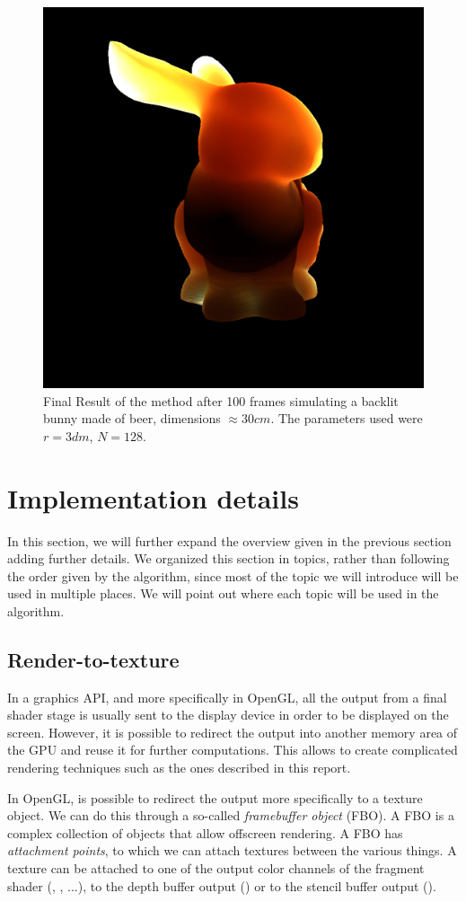 \begin{figure}[!ht]
\centering
\includegraphics[width=0.6 \linewidth]{images/results/beer_backlit_100_convergence.png}
\caption{Final Result of the method after 100 frames simulating a backlit bunny made of beer, dimensions $\approx 30 cm$. The parameters used were $r = 3 dm$, $N = 128$.}
\label{fig:beer_result}
\end{figure} 
 
\FloatBarrier

\section{Implementation details}
In this section, we will further expand the overview  given in the previous section adding further details. We organized this section in topics, rather than following the order given by the algorithm, since most of the topic we will introduce will be used in multiple places. We will point out where each topic will be used in the algorithm.

\subsection{Render-to-texture}
In a graphics API, and more specifically in OpenGL, all the output from a final shader stage is usually sent to the display device in order to be displayed on the screen. However, it is possible to redirect the output into another memory area of the GPU and reuse it for further computations. This allows to create complicated rendering techniques such as the ones described in this report. 

In OpenGL, is possible to redirect the output more specifically to a texture object. We can do this through a so-called \emph{framebuffer object} (FBO). A FBO is a complex collection of objects that allow offscreen rendering. A FBO has \emph{attachment points}, to which we can attach textures between the various things. A texture can be attached to one of the output color channels of the fragment shader (, , ...), to the depth buffer output () or to the stencil buffer output ().

